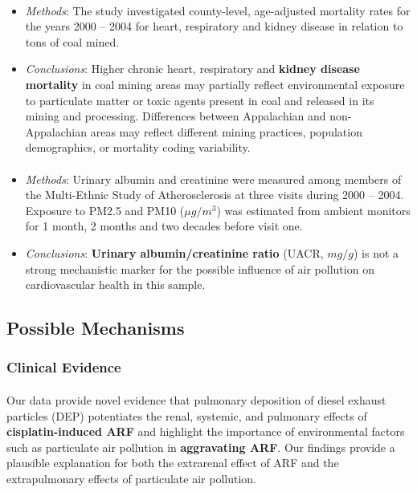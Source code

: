 \documentclass[11pt]{article}
\begin{document}
\paragraph{\citet{hendryx2009mortality}}
\begin{itemize}
    \item \textit{Methods}: The study investigated county-level, age-adjusted mortality rates for the years 2000 -- 2004 for heart, respiratory and kidney disease in relation to tons of coal mined. 
    \item \textit{Conclusions}: Higher chronic heart, respiratory and \textbf{kidney disease mortality} in coal mining areas may partially reflect environmental exposure to particulate matter or toxic agents present in coal and released in its mining and processing. Differences between Appalachian and non-Appalachian areas may reflect different mining practices, population demographics, or mortality coding variability.
\end{itemize}

\paragraph{\citet{o2008airborne}}
\begin{itemize}
    \item \textit{Methods}: Urinary albumin and creatinine were measured among members of the Multi-Ethnic Study of Atherosclerosis at three visits during 2000 -- 2004. Exposure to PM2.5 and PM10 ($\mu g/m^3$) was estimated from ambient monitors for 1 month, 2 months and two decades before visit one. 
    \item \textit{Conclusions}: \textbf{Urinary albumin/creatinine ratio} (UACR, $mg/g$) is not a strong mechanistic marker for the possible influence of air pollution on cardiovascular health in this sample.
\end{itemize}

\subsection{Possible Mechanisms}

\subsubsection{Clinical Evidence}
\paragraph{\citet{nemmar2009diesel}} Our data provide novel evidence that pulmonary deposition of diesel exhaust particles (DEP) potentiates the renal, systemic, and pulmonary effects of \textbf{cisplatin-induced ARF} and highlight the importance of environmental factors such as particulate air pollution in \textbf{aggravating ARF}. Our findings provide a plausible explanation for both the extrarenal effect of ARF and the extrapulmonary effects of particulate air pollution.
\end{document}
